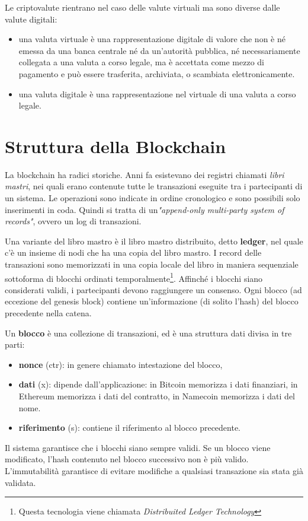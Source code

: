 Le criptovalute rientrano nel caso delle valute virtuali ma sono diverse dalle valute digitali:
\begin{itemize}
    \item una valuta virtuale è una rappresentazione digitale di valore che non è né emessa da una banca centrale né da un'autorità pubblica, né necessariamente collegata a una valuta a corso legale, ma è accettata come mezzo di pagamento e può essere trasferita, archiviata, o scambiata elettronicamente.
    \item una valuta digitale è una rappresentazione nel virtuale di una valuta a corso legale.
    \end{itemize}

\section{Struttura della Blockchain}
La blockchain ha radici storiche. Anni fa esistevano dei registri chiamati \textit{libri mastri}, nei quali erano contenute tutte le transazioni eseguite tra i partecipanti di un sistema. Le operazioni sono indicate in ordine cronologico e sono possibili solo inserimenti in coda. Quindi si tratta di un\textit{"append-only multi-party system of records"}, ovvero un log di transazioni.

Una variante del libro mastro è il libro mastro distribuito, detto \textbf{ledger}, nel quale c'è un insieme di nodi che ha una copia del libro mastro. I record delle transazioni sono memorizzati in una copia locale del libro in maniera sequenziale sottoforma di blocchi ordinati temporalmente\footnote{Questa tecnologia viene chiamata \textit{Distribuited Ledger Technology}}. Affinché i blocchi siano considerati validi, i partecipanti devono raggiungere un consenso. Ogni blocco (ad eccezione del genesis block) contiene un'informazione (di solito l'hash) del blocco precedente nella catena.

\vspace{5mm}

Un \textbf{blocco} è una collezione di transazioni, ed è una struttura dati divisa in tre parti: 
\begin{itemize}
    \item \textbf{nonce} (ctr): in genere chiamato intestazione del blocco,
    \item \textbf{dati} (x): dipende dall'applicazione: in Bitcoin memorizza i dati finanziari, in Ethereum memorizza i dati del contratto, in Namecoin memorizza i dati del nome.
    \item \textbf{riferimento} (s): contiene il riferimento al blocco precedente.
\end{itemize}
Il sistema garantisce che i blocchi siano sempre validi. Se un blocco viene modificato, l'hash contenuto nel blocco successivo non è più valido. L'immutabilità garantisce di evitare modifiche a qualsiasi transazione sia stata già validata.

